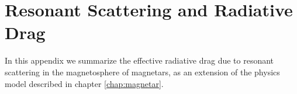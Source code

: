 
\chapter{Resonant Scattering and Radiative Drag}
\label{app:resontant-scattering}

In this appendix we summarize the effective radiative drag due to resonant
scattering in the magnetosphere of magnetars, as an extension of the physics
model described in chapter \ref{chap:magnetar}.

